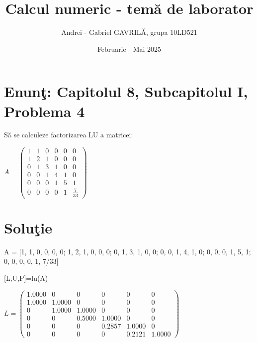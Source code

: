 \documentclass{article}
\begin{document}
\title{Calcul numeric - tem\u{a} de laborator}

\author{Andrei - Gabriel GAVRIL\u{A}, grupa 10LD521}

\date{Februarie - Mai 2025}

\maketitle

\section*{Enun\c{t}: Capitolul 8, Subcapitolul I, Problema 4}

S\u{a} se calculeze factorizarea LU a matricei:
\begin{center}
$
A=\begin{pmatrix}
  1 & 1 & 0 & 0 & 0 & 0 \\
  1 & 2 & 1 & 0 & 0 & 0 \\
  0 & 1 & 3 & 1 & 0 & 0 \\
  0 & 0 & 1 & 4 & 1 & 0 \\
  0 & 0 & 0 & 1 & 5 & 1 \\
  0 & 0 & 0 & 0 & 1 & \frac{7}{33}
\end{pmatrix}
$
\end{center}

\section*{Solu\c{t}ie}

\begin{center}
A = [1, 1, 0, 0, 0, 0; 1, 2, 1, 0, 0, 0; 0, 1, 3, 1, 0, 0; 0, 0, 1, 4, 1, 0; 0, 0, 0, 1, 5, 1; 0, 0, 0, 0, 1, 7/33]
\end{center}
\begin{center}
[L,U,P]=lu(A)
\end{center}

\begin{center}
$
L =\begin{pmatrix}
  1.0000 &        0 &        0 &        0 &        0 &        0 \\
  1.0000 &   1.0000 &        0 &        0 &        0 &        0 \\
       0 &   1.0000 &   1.0000 &        0 &        0 &        0 \\
       0 &        0 &   0.5000 &   1.0000 &        0 &        0 \\
       0 &        0 &        0 &   0.2857 &   1.0000 &        0 \\
       0 &        0 &        0 &        0 &   0.2121 &   1.0000
\end{pmatrix}
$
\end{center}
\end{document}
